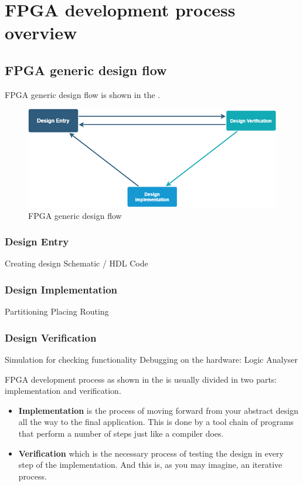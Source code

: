 \section{FPGA development process overview}

\subsection{FPGA generic design flow}
FPGA generic design flow is shown in the .

\begin{figure}[H]
	\begin{center}
		\includegraphics[width=\textwidth]{images/GenFlow.png}
		\caption{FPGA generic design flow}
		\label{FPGAGenFlow}
	\end{center}
\end{figure}

\subsubsection{Design Entry}
Creating design
Schematic / HDL Code

\subsubsection{Design Implementation}
Partitioning
Placing
Routing

\subsubsection{Design Verification}
Simulation for checking functionality
Debugging on the hardware: Logic Analyser




FPGA development process as shown in the  is usually divided in two parts: implementation and verification.

\begin{itemize}
	\item \textbf{Implementation} is the process of moving forward from your abstract design all the way to the final application. This is done by a tool chain of programs that perform a number of steps just like a compiler does. 
	\item \textbf{Verification} which is the necessary process of testing the design in every step of the implementation. And this is, as you may imagine, an iterative process. 
\end{itemize}	
	
